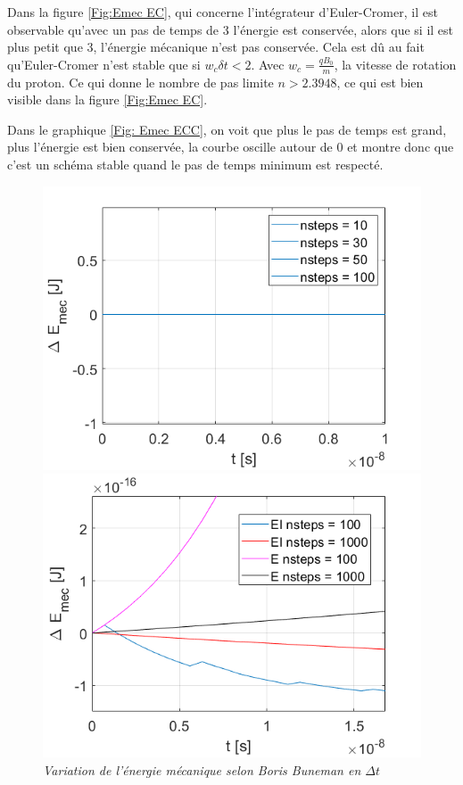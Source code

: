 \documentclass[a4paper,12pt,twoside]{article}
\begin{document}
		Dans la figure \ref{Fig:Emec EC}, qui concerne l'int\'egrateur d'Euler-Cromer, il est observable qu'avec un pas de temps de 3 l'\'energie est conserv\'ee, alors que si il est plus petit que 3, l'\'energie m\'ecanique n'est pas conserv\'ee. Cela est d\^u au fait qu'Euler-Cromer n'est stable que si $w_c \delta t <2$. Avec $w_c = \frac{qB_0}{m}$, la vitesse de rotation du proton. Ce qui donne le nombre de pas limite $n > 2.3948$, ce qui est bien visible dans la figure \ref{Fig:Emec EC}.
		
		Dans le graphique \ref{Fig: Emec ECC}, on voit que plus le pas de temps est grand, plus l'\'energie est bien conserv\'ee, la courbe oscille autour de 0 et montre donc que c'est un sch\'ema stable quand le pas de temps minimum est respect\'e.
		
		\begin{figure}[h]
			\begin{minipage}[c]{.46\linewidth}
				\centering
				\includegraphics[scale = 0.6]{D_E_mec_BB.png}
				\caption{\em\label{Fig:Emec BB} Variation de l'\'energie m\'ecanique selon Boris Buneman en $\Delta t$ }
			\end{minipage}
			\hfill%
			\begin{minipage}[c]{.46\linewidth}
				\centering
				\includegraphics[scale = 0.6]{D_E_mec_EI.png}

\end{minipage}
\end{figure}
\end{document}
